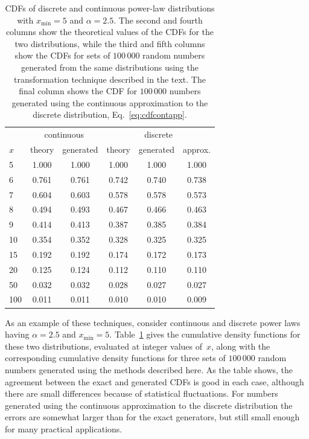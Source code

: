 \documentclass[final]{siamltex}
\newcommand{\xmin}{\ensuremath{x_{\min}}}
\begin{document}
\begin{appendix}
\begin{table}%
\begin{center}
\setlength{\tabcolsep}{4pt}
\begin{tabular}{l|cc|ccc}
   & \multicolumn{2}{c|}{continuous} & \multicolumn{3}{c}{discrete} \\
$x$ & theory & generated & theory & generated & approx. \\
\hline
5   & 1.000  & 1.000     & 1.000  & 1.000     & 1.000 \\
6   & 0.761  & 0.761     & 0.742  & 0.740     & 0.738 \\
7   & 0.604  & 0.603     & 0.578  & 0.578     & 0.573 \\
8   & 0.494  & 0.493     & 0.467  & 0.466     & 0.463 \\
9   & 0.414  & 0.413     & 0.387  & 0.385     & 0.384 \\
10  & 0.354  & 0.352     & 0.328  & 0.325     & 0.325 \\
15  & 0.192  & 0.192     & 0.174  & 0.172     & 0.173 \\
20  & 0.125  & 0.124     & 0.112  & 0.110     & 0.110 \\
50  & 0.032  & 0.032     & 0.028  & 0.027     & 0.027 \\
100 & 0.011  & 0.011     & 0.010  & 0.010     & 0.009 
\end{tabular}
\end{center}
\caption{CDFs of discrete and continuous power-law distributions with
 $\xmin=5$ and $\alpha=2.5$.  The second and fourth columns show the
 theoretical values of the CDFs for the two distributions, while the third
 and fifth columns show the CDFs for sets of $100\,000$ random numbers
 generated from the same distributions using the transformation technique
 described in the text.  The final column shows the CDF for $100\,000$
 numbers generated using the continuous approximation to the discrete
 distribution, Eq.~\eqref{eq:cdfcontapp}.}
\label{table:deviates}
\end{table}

As an example of these techniques, consider continuous and discrete power
laws having $\alpha=2.5$ and $\xmin=5$.  Table~\ref{table:deviates} gives
the cumulative density functions for these two distributions, evaluated at
integer values of~$x$, along with the corresponding cumulative density
functions for three sets of $100\,000$ random numbers generated using the
methods described here.  As the table shows, the agreement between the
exact and generated CDFs is good in each case, although there are small
differences because of statistical fluctuations.  For numbers generated
using the continuous approximation to the discrete distribution the errors
are somewhat larger than for the exact generators, but still small enough
for many practical applications.

\end{appendix}
\end{document}
